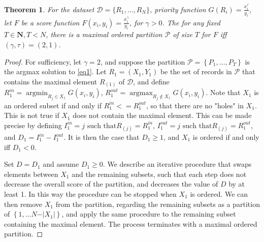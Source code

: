 \documentclass{article}
\newtheorem{thm}{Theorem}
\theoremstyle{case}
\DeclareMathOperator*{\argmax}{argmax} %
\DeclareMathOperator*{\argmin}{argmin} %
\begin{document}
\begin{thm}
For the dataset $\mathcal{D} = \{R_1, \dots, R_N\}$, priority function $G(R_i) = \frac{x_i^\tau}{y_i}$, let $F$ be a score function $F(x_i, y_i) = \frac{x_i^\gamma}{y_i}$, for $\gamma > 0$. The for any fixed $T \in \mathbf{N}, T < N$, there is a maximal ordered partition $\mathcal{P}$ of size $T$ for $F$ iff $\left(\gamma, \tau\right) = \left( 2, 1\right)$.
\end{thm}

\begin{proof}
For sufficiency, let $\gamma = 2$, and suppose the partition $\mathcal{P} = \left\lbrace P_1, \dots, P_T\right\rbrace$ is the argmax solution to \ref{eq1}. Let $R_1 = (X_1, Y_1)$ be the set of records in $\mathcal{P}$ that contains the maximal element $R_{(1)}$ of $\mathcal{D}$, and define $R_1^{in} = \argmin_{R_j \in X_1} G(x_i, y_i)$, $R_1^{out} = \argmax_{R_j \not\in X_1} G(x_i, y_i)$. Note that $X_1$ is an ordered subset if and only if $R_1^{in} <= R_1^{out}$, so that there are no "holes" in $X_1$. This is not true if $X_1$ does not contain the maximal element. This can be made precise by defining $I_1^{in} = j \text{ such that} R_{(j)} = R_1^{in}$, $I_1^{out} = j \text{ such that} R_{(j)} = R_1^{out}$, and $D_1 = I_1^{in} - I_1^{out}$. It is then the case that $D_1 \geq 1$, and $X_1$ is ordered if and only iff $D_1 < 0$.

Set $D = D_1$ and assume $D_1 \geq 0$. We describe an iterative procedure that swaps elements between $X_1$ and the remaining subsets, such that each step does not decrease the overall score of the partition, and decreases the value of $D$ by at least 1. In this way the procedure can be stopped when $X_1$ is ordered. We can then remove $X_1$ from the partition, regarding the remaining subsets as a partition of $\left\lbrace 1, \dots N-\vert X_1 \vert\right\rbrace$, and apply the same procedure to the remaining subset containing the maximal element. The process terminates with a maximal ordered partition.


\end{proof}
\end{document}
